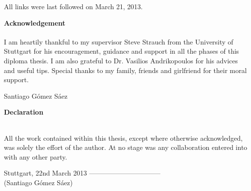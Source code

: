\documentclass[paper=a4,       %
					 11pt,
					 BCOR0mm,  %
					 DIV10,    %
					 automark, %
					 twoside,
					 halfparskip,
					 bibtotoc,
					 headsepline,
					 normalheadings,
					 appendixprefix,
					 pagesize  %
 ]{scrbook}
\begin{document}
\cleardoubleemptypage


\newpage









%



All links were last followed on March 21, 2013.

\clearpage
\pagestyle{empty}
\vspace{9cm}
\begin{center}
\begin{minipage}{11cm}
\vspace{6cm}

\textbf{\Large Acknowledgement}\\\\
I am heartily thankful to my supervisor Steve Strauch from the University of Stuttgart for his encouragement, guidance and support in all the phases of this diploma thesis. I am also grateful to Dr. Vasilios Andrikopoulos for his advices and useful tips.
Special thanks to my family, friends and girlfriend for their moral support.

\vspace{1cm}
Santiago G\'omez S\'aez

\end{minipage}
\end{center}

\clearpage
\pagestyle{empty}
\vspace{9cm}
\begin{center}
\begin{minipage}{11cm}
\vspace{6cm}

\textbf{\Large Declaration}\\\\
\vspace{0.4cm}

All the work contained within this thesis,
except where otherwise acknowledged, was
solely the effort of the author. At no
stage was any collaboration entered into
with any other party.
\vspace{1cm}

Stuttgart, 22nd March 2013 \hspace{1cm}--------------------------------\\
\phantom{Stuttgart, March 22 2013} \hspace{1.3cm} (Santiago G\'omez S\'aez)
\end{minipage}
\end{center}
\end{document}
